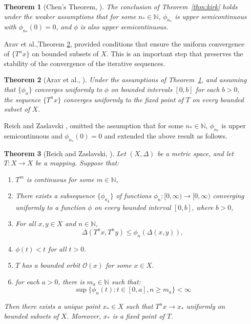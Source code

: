 \documentclass{birkjour}
\newtheorem{thm}{Theorem}[section]
\theoremstyle{definition}
\theoremstyle{remark}
\numberwithin{equation}{section}
\begin{document}
\begin{thm}[Chen's Theorem, \cite{chen2005asymptotic}]\label{thm:chen}
The conclusion of Theorem~\ref{thm:kirk} holds under the weaker assumptions that for some \(n_* \in \mathbb{N}\), \(\phi_{n_*}\) is upper semicontinuous with \(\phi_{n_*}(0) = 0\), and \(\phi\) is also upper semicontinuous.
\end{thm}
Arav et al.,Theorem \ref{thm:arav}, provided conditions that ensure the uniform convergence of $\{T^{n}x\}$ on bounded subsets of $X$. This is an important step that preserves the stability of the convergence of the iterative sequences. 
\begin{thm}[Arav et al., \cite{arav2007}]\label{thm:arav}
Under the assumptions of Theorem~\ref{thm:chen}, and assuming that \(\{\phi_{n}\}\) converges uniformly to \(\phi\) on bounded intervals $[0,b]$ for each $b>0$, the sequence \(\{T^n x\}\) converges uniformly to the fixed point of \(T\) on every bounded subset of \(X\).
\end{thm}
Reich and Zaslavski \cite{reich2008}, omitted the assumption that for some $n_*\in \mathbb{N}$, \(\phi_{n_*}\) is upper semicontinuous  and \(\phi_{n_*}(0)=0\) and extended the above result as follows.
\begin{thm}[Reich and Zaslavski, \cite{reich2008}]\label{thm:reich-zaslavski}
Let \((X, \Delta)\) be a metric space, and let \(T : X \to X\) be a mapping. Suppose that:
\begin{enumerate}
    \item \(T^m\) is continuous for some \(m \in \mathbb{N}\),
    \item There exists a subsequence \(\{\phi_{n_k}\}\) of functions \(\phi_n : [0,\infty) \to [0,\infty)\) converging uniformly to a function \(\phi\) on every bounded interval \([0, b]\), where \(b > 0\),
    \item For all \(x, y \in X\) and \(n \in \mathbb{N}\), 
    \[
    \Delta(T^n x, T^n y) \leq \phi_n(\Delta(x, y)),
    \]
    \item \(\phi(t) < t\) for all \(t > 0\).
\item $T$ has a bounded orbit $\mathcal{O}(x)$ for some $x\in X.$
\item for each $a>0$, there is $m_a\in\mathbb{N}$ such that:
\[
\sup\{\phi_{n}(t):t\in[0,a], n\geq m_a\}<\infty
\]
\end{enumerate}
Then there exists a unique point \(x_* \in X\) such that \(T^n x \to x_*\) uniformly on bounded subsets of \(X\). Moreover, \(x_*\) is a fixed point of \(T\).
\end{thm}
\end{document}
